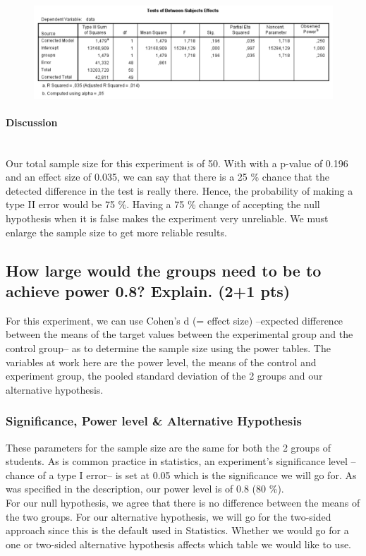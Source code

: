 \documentclass[14]{article}
\begin{document}
\begin{figure}[!htb]
	\includegraphics[width=1.0\textwidth]{img/question3/Power.PNG}
	\captionsetup{width=1.0\textwidth}
	\centering 
\end{figure}

\paragraph{Discussion}\mbox{}\\
Our total sample size for this experiment is of 50. With with a p-value of 0.196 and an effect size of 0.035, we can say that there is a 25 \% chance that the detected difference in the test is really there. Hence, the probability of making a type II error would be 75 \%.
\newline 
Having a 75 \% change of accepting the null hypothesis when it is false makes the experiment very unreliable. We must enlarge the sample size to get more reliable results.

\subsection{How large would the groups need to be to achieve power 0.8? Explain. (2+1 pts)}
For this experiment, we can use Cohen's d (= effect size) --expected difference between the means of the target values between the experimental group and the control group-- as to determine the sample size using the power tables.
\newline 
The variables at work here are the power level, the means of the control and experiment group, the pooled standard deviation of the 2 groups and our alternative hypothesis.

\subsubsection{Significance, Power level \& Alternative Hypothesis}
These parameters for the sample size are the same for both the 2 groups of students. As is common practice in statistics, an experiment's significance level --chance of a type I error-- is set at 0.05 which is the significance we will go for. As was specified in the description, our power level is of 0.8 (80 \%). \\
For our null hypothesis, we agree that there is no difference between the means of the two groups. For our alternative hypothesis, we will go for the two-sided approach since this is the default used in Statistics. Whether we would go for a one or two-sided alternative hypothesis affects which table we would like to use.
\newpage
\end{document}
